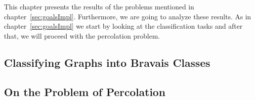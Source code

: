 This chapter presents the results of the problems mentioned in chapter~\ref{sec:goalsImpl}.
Furthermore, we are going to analyze these results. As in chapter~\ref{sec:goalsImpl} we start
by looking at the classification tasks and after that, we will proceed with the percolation problem.

\subsection{Classifying Graphs into Bravais Classes}


\subsection{On the Problem of Percolation}
